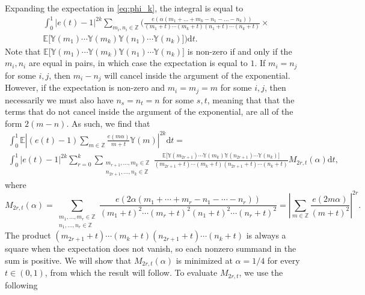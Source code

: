 \documentclass[12pt, a4paper]{amsart}
\theoremstyle{remark}
\newcommand{\ud}{\mathrm{d}}
\newcommand{\bY}{\mathbb{Y}}
\begin{document}
Expanding the expectation in \eqref{eq:phi_k}, the integral is equal to
\begin{multline*}
    \int_0^1
        \lvert e(t)-1\rvert^{2k}
        \sum_{m_i, n_i\in\mathbb Z}\Bigg(
            \frac{e(\alpha(m_1+\ldots +m_k - n_1-\ldots-n_k))}
                {(m_1+t)\cdots (m_k+t)(n_1+t)\cdots(n_k+t)} \times \\
            \mathbb E\big[\bY(m_1)\cdots \bY(m_k)\bY(n_1)\cdots \bY(n_k)\big]\Bigg)\ud t.
\end{multline*}
Note that $\mathbb E\big[\bY(m_1)\cdots \bY(m_k)\bY(n_1)\cdots \bY(n_k)\big]$ is non-zero if
and only if the $m_i, n_i$ are equal in pairs, in which case the expectation is
equal to $1$. If $m_i=n_j$ for some $i, j$, then $m_i - n_j$ will cancel inside
the argument of the exponential. However,  if the expectation is non-zero and
$m_i=m_j=m$ for some $i, j$, then necessarily we must also have $n_{s}=n_t=n$
for some $s, t$, meaning that that the terms that do not cancel inside the
argument of the exponential, are all of the form $2(m-n)$. As such, we find
that
\begin{multline*}
    \int_0^1
        \mathbb E\left\lvert(e(t)-1)\sum_{m\in\mathbb Z}
        \frac{e(m\alpha)}{m+t}\bY(m)\right\rvert^{2k}\ud t 
        = \\
    \int_0^1\lvert e(t)-1\rvert^{2k}
        \sum_{r=0}^{k}
        \sum_{\substack{m_{r+1}, \ldots, m_k\in\mathbb Z \\ n_{2r+1}, \ldots, n_k\in\mathbb Z}}
        \frac{\mathbb E\big[\bY(m_{2r+1})\cdots \bY(m_k)\bY(n_{2r+1})\cdots \bY(n_k)\big]}
                {(m_{2r+1}+t)\cdots (m_k+t)(n_{2r+1}+t)\cdots (n_k+t)}M_{2r,t}(\alpha)\ud t,
\end{multline*}
where 
\begin{equation*}
    M_{2r, t}(\alpha) = \sum_{\substack{m_1, \ldots, m_r\in\mathbb Z \\ n_1, \ldots, n_r\in\mathbb Z}}
        \frac{e(2\alpha(m_1+\cdots +m_r-n_1-\cdots-n_r))}
             {(m_1+t)^2\cdots (m_r+t)^2 (n_1+t)^2\cdots (n_r+t)^2}
        = \left\lvert\sum_{m\in\mathbb Z}\frac{e(2m\alpha)}{(m+t)^2}\right\rvert^{2r}.
\end{equation*}
The product $(m_{2r+1}+t)\cdots (m_k+t)(n_{2r+1}+t)\cdots (n_k+t)$
is always a square when the expectation does not vanish, so
each nonzero summand in the sum is positive. We will show that
$M_{2r, t}(\alpha)$ is minimized at $\alpha = 1/4$ for every $t \in (0,1)$, from which
the result will follow. To evaluate $M_{2r,t}$, we use the following 
\end{document}
